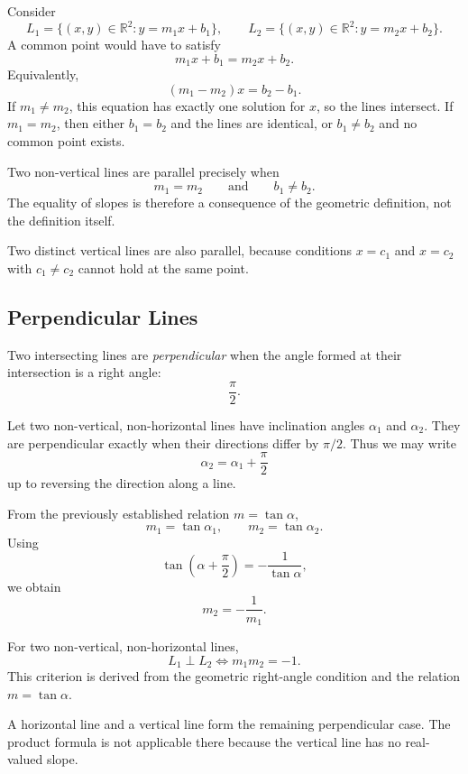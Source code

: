 Consider
\[
L_1=\{(x,y)\in\mathbb{R}^2:y=m_1x+b_1\},
\qquad
L_2=\{(x,y)\in\mathbb{R}^2:y=m_2x+b_2\}.
\]
A common point would have to satisfy
\[
m_1x+b_1=m_2x+b_2.
\]
Equivalently,
\[
(m_1-m_2)x=b_2-b_1.
\]
If $m_1\neq m_2$, this equation has exactly one solution for $x$, so the lines
intersect. If $m_1=m_2$, then either $b_1=b_2$ and the lines are identical, or
$b_1\neq b_2$ and no common point exists.

\begin{theorembox}
Two non-vertical lines are parallel precisely when
\[
\boxed{m_1=m_2
\qquad\text{and}\qquad
b_1\neq b_2.}
\]
The equality of slopes is therefore a consequence of the geometric definition,
not the definition itself.
\end{theorembox}

Two distinct vertical lines are also parallel, because conditions $x=c_1$ and
$x=c_2$ with $c_1\neq c_2$ cannot hold at the same point.

\subsection{Perpendicular Lines}

\begin{definitionbox}
Two intersecting lines are \emph{perpendicular} when the angle formed at their
intersection is a right angle:
\[
\boxed{\frac{\pi}{2}}.
\]
\end{definitionbox}

Let two non-vertical, non-horizontal lines have inclination angles $\alpha_1$
and $\alpha_2$. They are perpendicular exactly when their directions differ by
$\pi/2$. Thus we may write
\[
\alpha_2=\alpha_1+\frac{\pi}{2}
\]
up to reversing the direction along a line.

From the previously established relation $m=\tan\alpha$,
\[
m_1=\tan\alpha_1,
\qquad
m_2=\tan\alpha_2.
\]
Using
\[
\tan\left(\alpha+\frac{\pi}{2}\right)
=-\frac{1}{\tan\alpha},
\]
we obtain
\[
m_2=-\frac{1}{m_1}.
\]

\begin{theorembox}
For two non-vertical, non-horizontal lines,
\[
\boxed{L_1\perp L_2
\iff
m_1m_2=-1.}
\]
This criterion is derived from the geometric right-angle condition and the
relation $m=\tan\alpha$.
\end{theorembox}

A horizontal line and a vertical line form the remaining perpendicular case.
The product formula is not applicable there because the vertical line has no
real-valued slope.

